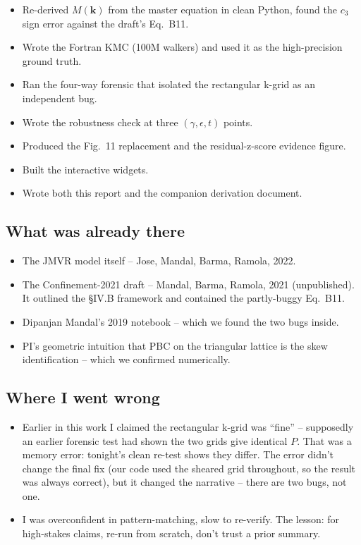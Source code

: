 \documentclass[11pt,a4paper]{article}
\newcommand{\vk}{\mathbf{k}}
\begin{document}
\begin{itemize}[leftmargin=*]
\item Re-derived $M(\vk)$ from the master equation in clean Python,
  found the $c_3$ sign error against the draft's Eq.~B11.
\item Wrote the Fortran KMC (100M walkers) and used it as the
  high-precision ground truth.
\item Ran the four-way forensic that isolated the rectangular k-grid
  as an independent bug.
\item Wrote the robustness check at three $(\gamma, \epsilon, t)$ points.
\item Produced the Fig.~11 replacement and the residual-z-score
  evidence figure.
\item Built the interactive widgets.
\item Wrote both this report and the companion derivation document.
\end{itemize}

\subsection{What was already there}\label{ssec:already}

\begin{itemize}[leftmargin=*]
\item The JMVR model itself -- Jose, Mandal, Barma, Ramola, 2022.
\item The Confinement-2021 draft -- Mandal, Barma, Ramola, 2021
  (unpublished). It outlined the §IV.B framework and contained the
  partly-buggy Eq.~B11.
\item Dipanjan Mandal's 2019 notebook -- which we found the two bugs
  inside.
\item PI's geometric intuition that PBC on the triangular lattice is
  the skew identification -- which we confirmed numerically.
\end{itemize}

\subsection{Where I went wrong}\label{ssec:wrong}

\begin{itemize}[leftmargin=*]
\item Earlier in this work I claimed the rectangular k-grid was
  ``fine'' -- supposedly an earlier forensic test had shown the two
  grids give identical $P$. That was a memory error: tonight's clean
  re-test shows they differ. The error didn't change the final fix
  (our code used the sheared grid throughout, so the result was always
  correct), but it changed the narrative -- there are two bugs, not one.
\item I was overconfident in pattern-matching, slow to re-verify. The
  lesson: for high-stakes claims, re-run from scratch, don't trust a
  prior summary.
\end{itemize}
\end{document}
